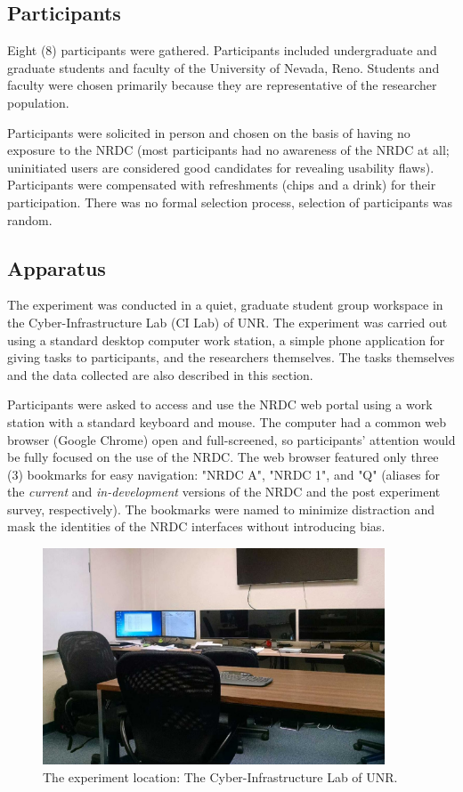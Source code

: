 \documentclass{acm_proc_article-sp}
\begin{document}
\subsection{Participants}
Eight (8) participants were gathered. Participants included undergraduate and graduate students and faculty of the University of Nevada, Reno. Students and faculty were chosen primarily because they are representative of the researcher population.

Participants were solicited in person and chosen on the basis of having no exposure to the NRDC (most participants had no awareness of the NRDC at all; uninitiated users are considered good candidates for revealing usability flaws\cite{dontmakemethink}). Participants were compensated with refreshments (chips and a drink) for their participation. There was no formal selection process, selection of participants was random.

%
\subsection{Apparatus}
The experiment was conducted in a quiet, graduate student group workspace in the Cyber-Infrastructure Lab (CI Lab) of UNR. The experiment was carried out using a standard desktop computer work station, a simple phone application for giving tasks to participants, and the researchers themselves. The tasks themselves and the data collected are also described in this section.

Participants were asked to access and use the NRDC web portal using a work station with a standard keyboard and mouse. The computer had a common web browser (Google Chrome) open and full-screened, so participants' attention would be fully focused on the use of the NRDC. The web browser featured only three (3) bookmarks for easy navigation: "NRDC A", "NRDC 1", and "Q" (aliases for the \emph{current} and \emph{in-development} versions of the NRDC and the post experiment survey, respectively). The bookmarks were named to minimize distraction and mask the identities of the NRDC interfaces without introducing bias.

\begin{figure}[h!]
  \centering
  \includegraphics[width=.8\linewidth]{ci_lab_apparatus}
  \caption{The experiment location: The Cyber-Infrastructure Lab of UNR.}
  \label{fig:ci_lab}
\end{figure}
\end{document}
